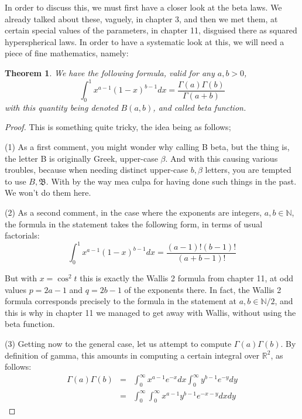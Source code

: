 \documentclass[12pt]{amsbook}
\newtheorem{theorem}{Theorem}[chapter]
\begin{document}
\bigskip

In order to discuss this, we must first have a closer look at the beta laws. We already talked about these, vaguely, in chapter 3, and then we met them, at certain special values of the parameters, in chapter 11, disguised there as squared hyperspherical laws. In order to have a systematic look at this, we will need a piece of fine mathematics, namely:

\begin{theorem}
We have the following formula, valid for any $a,b>0$,
$$\int_0^1x^{a-1}(1-x)^{b-1}dx=\frac{\Gamma(a)\Gamma(b)}{\Gamma(a+b)}$$
with this quantity being denoted $B(a,b)$, and called beta function. 
\end{theorem}

\begin{proof}
This is something quite tricky, the idea being as follows;

\medskip

(1) As a first comment, you might wonder why calling B beta, but the thing is, the letter B is originally Greek, upper-case $\beta$. And with this causing various troubles, because when needing distinct upper-case $b,\beta$ letters, you are tempted to use $B,\mathfrak B$. With by the way mea culpa for having done such things in the past. We won't do them here.

\medskip

(2) As a second comment, in the case where the exponents are integers, $a,b\in\mathbb N$, the formula in the statement takes the following form, in terms of usual factorials:
$$\int_0^1x^{a-1}(1-x)^{b-1}dx=\frac{(a-1)!(b-1)!}{(a+b-1)!}$$

But with $x=\cos^2t$ this is exactly the Wallis 2 formula from chapter 11, at odd values $p=2a-1$ and $q=2b-1$ of the exponents there. In fact, the Wallis 2 formula corresponds precisely to the formula in the statement at $a,b\in\mathbb N/2$, and this is why in chapter 11 we managed to get away with Wallis, without using the beta function.

\medskip

(3) Getting now to the general case, let us attempt to compute $\Gamma(a)\Gamma(b)$. By definition of gamma, this amounts in computing a certain integral over $\mathbb R^2$, as follows:
\begin{eqnarray*}
\Gamma(a)\Gamma(b)
&=&\int_0^\infty x^{a-1}e^{-x}dx\int_0^\infty y^{b-1}e^{-y}dy\\
&=&\int_0^\infty\int_0^\infty x^{a-1}y^{b-1}e^{-x-y}dxdy
\end{eqnarray*}


\end{proof}
\end{document}
